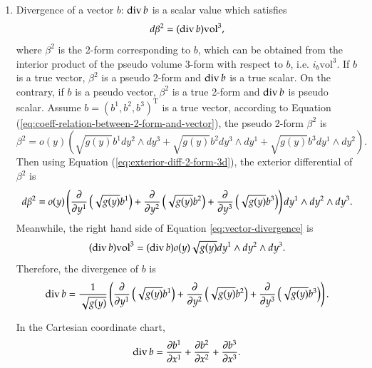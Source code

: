 \documentclass[11pt, a4paper]{book}
\begin{document}
\begin{enumerate}
\item Divergence of a vector $b$: $\operatorname{div} b$ is a scalar value which satisfies
  \begin{equation}
    \label{eq:vector-divergence}
    d\beta^2 = (\operatorname{div} b) \mathrm{vol}^3,
  \end{equation}
  where $\beta^2$ is the 2-form corresponding to $b$, which can be obtained from the
  interior product of the pseudo volume 3-form with respect to $b$, i.e.
  $i_b \mathrm{vol}^3$. If $b$ is a true vector, $\beta^2$ is a pseudo 2-form and
  $\operatorname{div} b$ is a true scalar. On the contrary, if $b$ is a pseudo vector, $\beta^2$
  is a true 2-form and $\operatorname{div} b$ is pseudo scalar. Assume
  $b = (b^1,b^2,b^3)^{\mathrm{T}}$ is a true vector, according to Equation
  (\ref{eq:coeff-relation-between-2-form-and-vector}), the pseudo 2-form $\beta^2$ is
  \begin{equation}
    \beta^2 = o(y) \left( \sqrt{g(y)} b^1 dy^2 \wedge dy^3 + \sqrt{g(y)} b^2 dy^3 \wedge dy^1 +
      \sqrt{g(y)} b^3 dy^1 \wedge dy^2 \right).
  \end{equation}
  Then using Equation (\ref{eq:exterior-diff-2-form-3d}), the exterior differential of
  $\beta^2$ is
  \begin{equation}
    d\beta^2 = o(y) \left( \frac{\partial}{\partial y^1} \left( \sqrt{g(y)}b^1 \right) +
      \frac{\partial}{\partial y^2} \left( \sqrt{g(y)}b^2 \right) + \frac{\partial}{\partial y^3}
      \left( \sqrt{g(y)}b^3 \right) \right) dy^1 \wedge dy^2 \wedge dy^3.
  \end{equation}
  Meanwhile, the right hand side of Equation \ref{eq:vector-divergence} is
  \begin{equation}
    (\operatorname{div} b) \mathrm{vol}^3 = (\operatorname{div} b) o(y) \sqrt{g(y)} dy^1 \wedge dy^2
    \wedge dy^3.
  \end{equation}
  Therefore, the divergence of $b$ is
  \begin{equation}
    \label{eq:div-expr-general}
    \operatorname{div} b = \frac{1}{\sqrt{g(y)}} \left( \frac{\partial}{\partial y^1} \left(
        \sqrt{g(y)}b^1 \right) + \frac{\partial}{\partial y^2} \left( \sqrt{g(y)}b^2 \right) +
      \frac{\partial}{\partial y^3} \left( \sqrt{g(y)}b^3 \right) \right).
  \end{equation}

  In the Cartesian coordinate chart,
  \begin{equation}
    \label{eq:div-expr-cartesian}
    \operatorname{div} b = \frac{\partial b^1}{\partial x^1} + \frac{\partial b^{2}}{\partial x^{2}} +
    \frac{\partial b^{3}}{\partial x^{3}}.
  \end{equation}


\end{enumerate}
\end{document}
